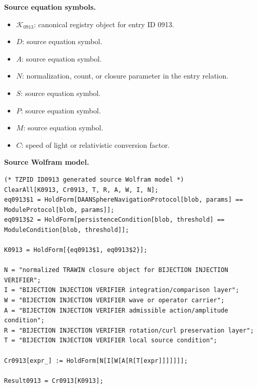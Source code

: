 \begin{minipage}[t]{0.49\linewidth}
\begingroup
\small
\raggedright
\textbf{Source equation symbols.}\par
\begin{itemize}[leftmargin=1.35em,itemsep=1pt,topsep=1pt,parsep=0pt]
    \item $\mathcal{K}_{0913}$: canonical registry object for entry ID 0913.
    \item $D$: source equation symbol.
    \item $A$: source equation symbol.
    \item $N$: normalization, count, or closure parameter in the entry relation.
    \item $S$: source equation symbol.
    \item $P$: source equation symbol.
    \item $M$: source equation symbol.
    \item $C$: speed of light or relativistic conversion factor.
\end{itemize}
\endgroup
\end{minipage}\hfill
\begin{minipage}[t]{0.47\linewidth}
\begingroup
\scriptsize
\raggedright
\textbf{Source Wolfram model.}\par
\begin{Verbatim}[fontsize=\tiny,breaklines=true,breakanywhere=true]
(* TZPID ID0913 generated source Wolfram model *)
ClearAll[K0913, Cr0913, T, R, A, W, I, N];
eq0913$1 = HoldForm[DAANSphereNavigationProtocol[blob, params] == ModuleProtocol[blob, params]];
eq0913$2 = HoldForm[persistenceCondition[blob, threshold] == ModuleCondition[blob, threshold]];

K0913 = HoldForm[{eq0913$1, eq0913$2}];

N = "normalized TRAWIN closure object for BIJECTION INJECTION VERIFIER";
I = "BIJECTION INJECTION VERIFIER integration/comparison layer";
W = "BIJECTION INJECTION VERIFIER wave or operator carrier";
A = "BIJECTION INJECTION VERIFIER admissible action/amplitude condition";
R = "BIJECTION INJECTION VERIFIER rotation/curl preservation layer";
T = "BIJECTION INJECTION VERIFIER local source condition";

Cr0913[expr_] := HoldForm[N[I[W[A[R[T[expr]]]]]]];

Result0913 = Cr0913[K0913];
\end{Verbatim}
\endgroup
\end{minipage}

